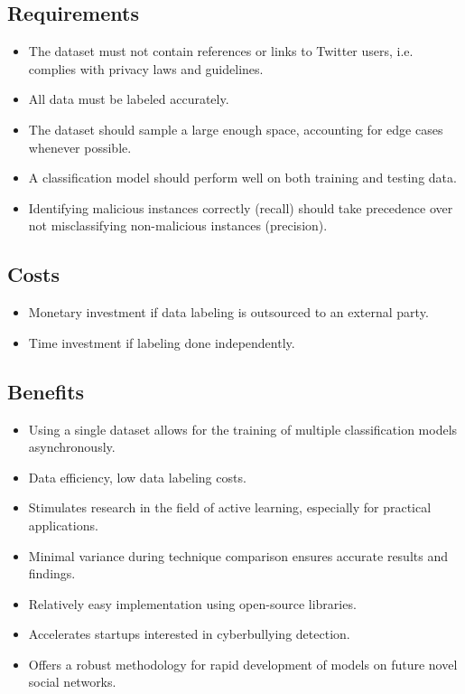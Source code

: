 \documentclass[a4paper,12pt]{article}
\begin{document}
    \subsection{Requirements}
    \label{subsection:req}
    \begin{itemize}
        \item The dataset must not contain references or links to Twitter users, i.e. complies with privacy laws and guidelines.
        \item All data must be labeled accurately.
        \item The dataset should sample a large enough space, accounting for edge cases whenever possible.
        \item A classification model should perform well on both training and testing data.
        \item Identifying malicious instances correctly (recall) should take precedence over not misclassifying non-malicious instances (precision).
    \end{itemize}
    \subsection{Costs}
    \begin{itemize}
        \item Monetary investment if data labeling is outsourced to an external party.
        \item Time investment if labeling done independently.
    \end{itemize}
    \subsection{Benefits}
    \begin{itemize}
        \item Using a single dataset allows for the training of multiple classification models asynchronously.
        \item Data efficiency, low data labeling costs.
        \item Stimulates research in the field of active learning, especially for practical applications.
        \item Minimal variance during technique comparison ensures accurate results and findings.
        \item Relatively easy implementation using open-source libraries.
        \item Accelerates startups interested in cyberbullying detection.
        \item Offers a robust methodology for rapid development of models on future novel social networks.
    \end{itemize}
\end{document}
